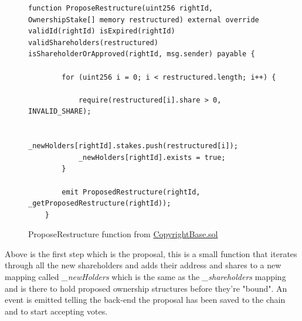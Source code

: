 \begin{figure}[H]
\caption{ProposeRestructure function from \href{https://github.com/MrHarrisonBarker/CRPL/blob/main/CRPL.Contracts/contracts/Copyrights/CopyrightBase.sol}{CopyrightBase.sol}}
\centering
\begin{lstlisting}[language=Solidity]
function ProposeRestructure(uint256 rightId, OwnershipStake[] memory restructured) external override validId(rightId) isExpired(rightId) validShareholders(restructured) isShareholderOrApproved(rightId, msg.sender) payable {
        
        for (uint256 i = 0; i < restructured.length; i++) {

            require(restructured[i].share > 0, INVALID_SHARE);

            _newHolders[rightId].stakes.push(restructured[i]);
            _newHolders[rightId].exists = true;
        }   

        emit ProposedRestructure(rightId, _getProposedRestructure(rightId));
    }	
\end{lstlisting}
\end{figure}

Above is the first step which is the proposal, this is a small function that iterates through all the new shareholders and adds their address and shares to a new mapping called \textit{\_newHolders} which is the same as the \textit{\_shareholders} mapping and is there to hold proposed ownership structures before they're "bound". An event is emitted telling the back-end the proposal has been saved to the chain and to start accepting votes.

